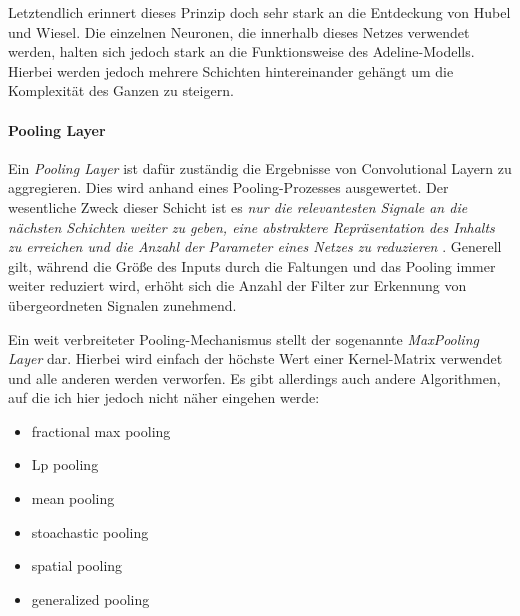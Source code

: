 Letztendlich erinnert dieses Prinzip doch sehr stark an die Entdeckung von Hubel und Wiesel. Die einzelnen Neuronen, die innerhalb dieses Netzes verwendet werden, halten sich jedoch stark an die Funktionsweise des Adeline-Modells. Hierbei werden jedoch mehrere Schichten hintereinander gehängt um die Komplexität des Ganzen zu steigern. 

\paragraph{Pooling Layer}
Ein \emph{Pooling Layer} ist dafür zuständig die Ergebnisse von Convolutional Layern zu aggregieren. Dies wird anhand eines Pooling-Prozesses ausgewertet. Der wesentliche Zweck dieser Schicht ist es \emph{nur die relevantesten Signale an die nächsten Schichten weiter zu geben, eine abstraktere Repräsentation des Inhalts zu erreichen und die Anzahl der Parameter eines Netzes zu reduzieren} \cite{cnnFunktionsweise2}. Generell gilt, während die Größe des Inputs durch die Faltungen und das Pooling immer weiter reduziert wird, erhöht sich die Anzahl der Filter zur Erkennung von übergeordneten Signalen zunehmend.

Ein weit verbreiteter Pooling-Mechanismus stellt der sogenannte \emph{MaxPooling Layer} dar. Hierbei wird einfach der höchste Wert einer Kernel-Matrix verwendet und alle anderen werden verworfen. Es gibt allerdings auch andere Algorithmen, auf die ich hier jedoch nicht näher eingehen werde: 

\begin{multicols}{2}
\begin{itemize}
\item fractional max pooling
\item Lp pooling
\item mean pooling
\item stoachastic pooling
\item spatial pooling
\item generalized pooling
\end{itemize}
\end{multicols}


